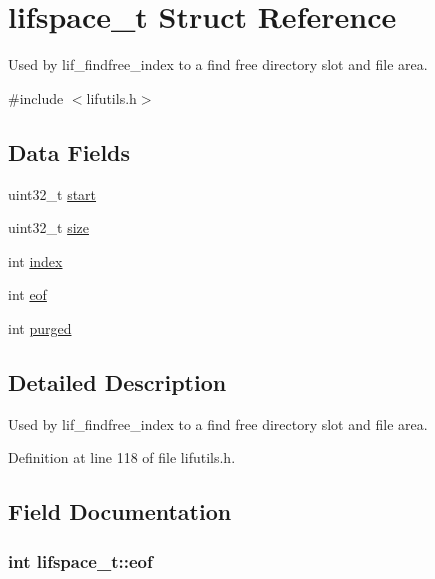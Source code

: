 \hypertarget{structlifspace__t}{}\section{lifspace\+\_\+t Struct Reference}
\label{structlifspace__t}


Used by lif\+\_\+findfree\+\_\+index to a find free directory slot and file area.  




{\ttfamily \#include $<$lifutils.\+h$>$}

\subsection*{Data Fields}
\begin{DoxyCompactItemize}
\item 
uint32\+\_\+t \hyperlink{structlifspace__t_a35702daf31460f978a09aef7a42c2671}{start}
\item 
uint32\+\_\+t \hyperlink{structlifspace__t_a0519f0089ed8694cbb2208364c6b31bd}{size}
\item 
int \hyperlink{structlifspace__t_abcca3daca009eca56173dc8577d597da}{index}
\item 
int \hyperlink{structlifspace__t_ad676dc78af3d2cd07c729affab6ec27e}{eof}
\item 
int \hyperlink{structlifspace__t_a53fce276ffb7bb4f8556cc2e7ac76390}{purged}
\end{DoxyCompactItemize}


\subsection{Detailed Description}
Used by lif\+\_\+findfree\+\_\+index to a find free directory slot and file area. 

Definition at line 118 of file lifutils.\+h.



\subsection{Field Documentation}
\subsubsection[{\texorpdfstring{eof}{eof}}]{\setlength{\rightskip}{0pt plus 5cm}int lifspace\+\_\+t\+::eof}\hypertarget{structlifspace__t_ad676dc78af3d2cd07c729affab6ec27e}{}\label{structlifspace__t_ad676dc78af3d2cd07c729affab6ec27e}


